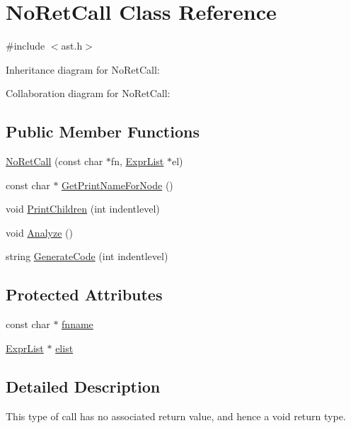 \hypertarget{class_no_ret_call}{}\section{No\+Ret\+Call Class Reference}
\label{class_no_ret_call}


{\ttfamily \#include $<$ast.\+h$>$}



Inheritance diagram for No\+Ret\+Call\+:


Collaboration diagram for No\+Ret\+Call\+:
\subsection*{Public Member Functions}
\begin{DoxyCompactItemize}
\item 
\hyperlink{class_no_ret_call_adb7fef6a0a2f27c75f9c73c164ea20a2}{No\+Ret\+Call} (const char $\ast$fn, \hyperlink{class_expr_list}{Expr\+List} $\ast$el)
\item 
const char $\ast$ \hyperlink{class_no_ret_call_abfbfa06b9f232f16f1922f1c95b406d9}{Get\+Print\+Name\+For\+Node} ()
\item 
void \hyperlink{class_no_ret_call_a1645309e5db0b7b6ced656a304248600}{Print\+Children} (int indentlevel)
\item 
void \hyperlink{class_no_ret_call_a9714a8c4429eb932be749909b47394fa}{Analyze} ()
\item 
string \hyperlink{class_no_ret_call_aa22f4dafc2369254349a631034f498d0}{Generate\+Code} (int indentlevel)
\end{DoxyCompactItemize}
\subsection*{Protected Attributes}
\begin{DoxyCompactItemize}
\item 
const char $\ast$ \hyperlink{class_no_ret_call_af4879d2f433a03c715e74124d636f4d2}{fnname}
\item 
\hyperlink{class_expr_list}{Expr\+List} $\ast$ \hyperlink{class_no_ret_call_a2ce5041d16e7ac1ea8b338ad2005d7a2}{elist}
\end{DoxyCompactItemize}


\subsection{Detailed Description}
This type of call has no associated return value, and hence a void return type. 

